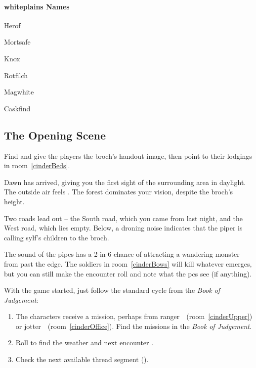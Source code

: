 \begin{multicols}{2}
\begin{multicols}{2}
\paragraph{\Gls{whiteplains} Names}

\begin{dlist}
  \item
  Herof
  \item
  Mortsafe
  \item
  Knox
  \item
  Rotfilch
  \item
  Magwhite
  \item
  Caskfind
\end{dlist}

\end{multicols}

\vspace{-4em}
\subsection{The Opening Scene}

Find   and give the players the \gls{broch}'s handout image, then point to their lodgings in room~\ref{cinderBeds}.

\begin{boxtext}
  Dawn has arrived, giving you the first sight of the surrounding area in daylight.
  The outside air feels \showTemperature.
  The forest dominates your vision, despite the \gls{broch}'s height.

  Two roads lead out -- the South road, which you came from last night, and the West road, which lies empty.
  Below, a droning noise indicates that the piper is calling \gls{sylf}'s children to the \gls{broch}.
\end{boxtext}

The sound of the pipes has a 2-in-6 chance of attracting a wandering \gls{monster} from past the \gls{edge}.
The \glspl{soldier} in room~\ref{cinderBows} will kill whatever emerges, but you can still make the encounter roll and note what the \glspl{pc} see (if anything).

With the game started, just follow the standard cycle from the \textit{Book of Judgement}:

\begin{enumerate}
  \item
  The characters receive a mission, perhaps from \Gls{ranger}~\composeHumanName\ (room~\ref{cinderUpper}) or \Gls{jotter}~\composeHumanName\ (room~\ref{cinderOffice}).
  Find the missions in the \textit{Book of Judgement}\iftoggle{judgement}{ (\autopageref{NGmissions})}{}.
  \item
  Roll to find the weather and next encounter \iftoggle{judgement}{(\textit{Book of Judgement}, pages \pageref{weather} and \pageref{randomEncounters})}{on the \gls{gm}-shield}.
  \item
  Check the next available \gls{thread} \gls{segment} ().
\end{enumerate}


\end{multicols}
